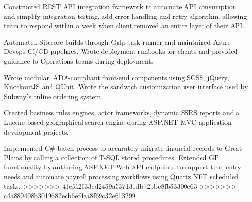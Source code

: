 \begin{cventries}
{\begin{cvitems}
		\item {Constructed REST API integration framework to automate API consumption and simplify integration testing, add error handling and retry algorithm, allowing team to respond within a week when client removed an entire layer of their API.}
		\item {Automated Sitecore builds through Gulp task runner and maintained Azure Devops CI/CD pipelines. Wrote deployment runbooks for clients and provided guidance to Operations teams during deployments}
		\item {Wrote modular, ADA-compliant front-end components using SCSS, jQuery, KnockoutJS and QUnit. Wrote the sandwich customization user interface used by Subway’s online ordering system.}
		\item {Created business rules engines, actor frameworks, dynamic SSRS reports and a Lucene-based geographical search engine during ASP.NET MVC application development projects.}
		\item {Implemented C# batch process to accurately migrate financial records to Great Plains by calling a collection of T-SQL stored procedures. Extended GP functionality by authoring ASP.NET Web API endpoints to support time entry needs and automate payroll processing workflows using Quartz.NET scheduled tasks.}
>>>>>>> 41efd2033ed2459a537131db72bbc8fb53300e63
>>>>>>> c4a880408b3019682ecb6ef4ea8f69c32e613299
      \end{cvitems}
    }


\end{cventries}
